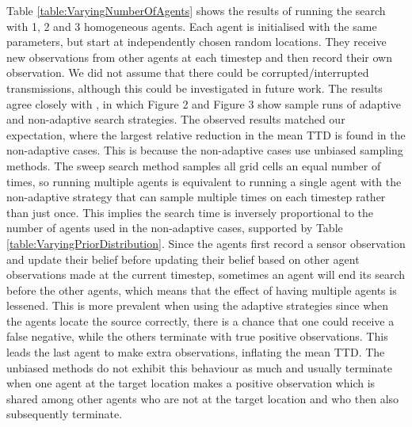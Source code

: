 Table \ref{table:VaryingNumberOfAgents} shows the results of running the search with 1, 2 and 3 homogeneous agents. Each agent is initialised with the same parameters, but start at independently chosen random locations. They receive new observations from other agents at each timestep and then record their own observation. We did not assume that there could be corrupted/interrupted transmissions, although this could be investigated in future work. The results agree closely with \cite{Chung2008Multi-agentFramework}, in which Figure 2 and Figure 3 show sample runs of adaptive and non-adaptive search strategies. The observed results matched our expectation, where the largest relative reduction in the mean TTD is found in the non-adaptive cases. This is because the non-adaptive cases use unbiased sampling methods. The sweep search method samples all grid cells an equal number of times, so running multiple agents is equivalent to running a single agent with the non-adaptive strategy that can sample multiple times on each timestep rather than just once. This implies the search time is inversely proportional to the number of agents used in the non-adaptive cases, supported by Table \ref{table:VaryingPriorDistribution}. Since the agents first record a sensor observation and update their belief before updating their belief based on other agent observations made at the current timestep, sometimes an agent will end its search before the other agents, which means that the effect of having multiple agents is lessened. This is more prevalent when using the adaptive strategies since when the agents locate the source correctly, there is a chance that one could receive a false negative, while the others terminate with true positive observations. This leads the last agent to make extra observations, inflating the mean TTD. The unbiased methods do not exhibit this behaviour as much and usually terminate when one agent at the target location makes a positive observation which is shared among other agents who are not at the target location and who then also subsequently terminate.

